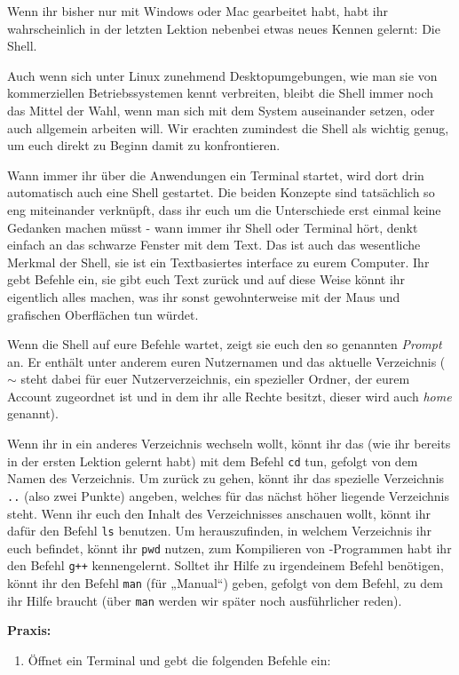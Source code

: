 
Wenn ihr bisher nur mit Windows oder Mac gearbeitet habt, habt ihr
wahrscheinlich in der letzten Lektion nebenbei etwas neues Kennen gelernt: Die
Shell.

Auch wenn sich unter Linux zunehmend Desktopumgebungen, wie man sie von
kommerziellen Betriebssystemen kennt verbreiten, bleibt die Shell immer noch das
Mittel der Wahl, wenn man sich mit dem System auseinander setzen, oder auch
allgemein arbeiten will. Wir erachten zumindest die Shell als wichtig genug, um
euch direkt zu Beginn damit zu konfrontieren.

Wann immer ihr über die Anwendungen ein Terminal startet, wird dort drin
automatisch auch eine Shell gestartet. Die beiden Konzepte sind tatsächlich so
eng miteinander verknüpft, dass ihr euch um die Unterschiede erst einmal keine
Gedanken machen müsst - wann immer ihr Shell oder Terminal hört, denkt einfach
an das schwarze Fenster mit dem Text. Das ist auch das wesentliche Merkmal der
Shell, sie ist ein Textbasiertes interface zu eurem Computer. Ihr gebt Befehle
ein, sie gibt euch Text zurück und auf diese Weise könnt ihr eigentlich alles
machen, was ihr sonst gewohnterweise mit der Maus und grafischen Oberflächen
tun würdet.

Wenn die Shell auf eure Befehle wartet, zeigt sie euch den so genannten
\emph{Prompt} an. Er enthält unter anderem euren Nutzernamen und das aktuelle
Verzeichnis ($\sim$ steht dabei für euer Nutzerverzeichnis, ein spezieller
Ordner, der eurem Account zugeordnet ist und in dem ihr alle Rechte besitzt,
dieser wird auch \emph{home} genannt).

Wenn ihr in ein anderes Verzeichnis wechseln wollt, könnt ihr das (wie ihr
bereits in der ersten Lektion gelernt habt) mit dem Befehl \texttt{cd} tun,
gefolgt von dem Namen des Verzeichnis. Um zurück zu gehen, könnt ihr das
spezielle Verzeichnis \texttt{..} (also zwei Punkte) angeben, welches für das
nächst höher liegende Verzeichnis steht. Wenn ihr euch den Inhalt des
Verzeichnisses anschauen wollt, könnt ihr dafür den Befehl \texttt{ls}
benutzen. Um herauszufinden, in welchem Verzeichnis ihr euch befindet, könnt
ihr \texttt{pwd} nutzen, zum Kompilieren von \Cpp-Programmen habt ihr den Befehl
\texttt{g++} kennengelernt. Solltet ihr Hilfe zu irgendeinem Befehl benötigen,
könnt ihr den Befehl \texttt{man} (für „Manual“) geben, gefolgt von dem Befehl,
zu dem ihr Hilfe braucht (über \texttt{man} werden wir später noch
ausführlicher reden).

\textbf{Praxis:}
\begin{enumerate}
    \item Öffnet ein Terminal und gebt die folgenden Befehle ein:
\end{enumerate}


